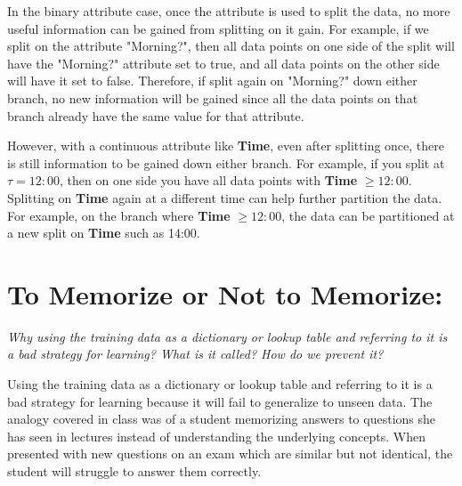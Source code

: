 \documentclass[fleqn]{article}
\begin{document}
\begin{enumerate}
	      In the binary attribute case, once the attribute is used to split the data, no more useful information can be gained from splitting on it gain.
	      For example, if we split on the attribute "Morning?", then all data points on one side of the split will have the "Morning?" attribute set to true,
	      and all data points on the other side will have it set to false.
	      Therefore, if split again on "Morning?" down either branch, no new information will be gained since all the data points on that branch already have the same value for that attribute.

	      However, with a continuous attribute like \textbf{Time}, even after splitting once, there is still information to be gained down either branch.
	      For example, if you split at $\tau = 12:00$, then on one side you have all data points with \textbf{Time} $\geq 12:00$.
	      Splitting on \textbf{Time} again at a different time can help further partition the data.
	      For example, on the branch where \textbf{Time} $\geq 12:00$, the data can be partitioned at a new split on \textbf{Time} such as 14:00.

\end{enumerate}




\section{To Memorize or Not to Memorize:}
\textit{Why using the training data as a dictionary or lookup table and referring to it is a bad strategy for learning? What is it called? How do we prevent it?}

Using the training data as a dictionary or lookup table and referring to it is a bad strategy for learning because it will fail to generalize to unseen data.
The analogy covered in class was of a student memorizing answers to questions she has seen in lectures instead of understanding the underlying concepts.
When presented with new questions on an exam which are similar but not identical, the student will struggle to answer them correctly.
\end{document}
